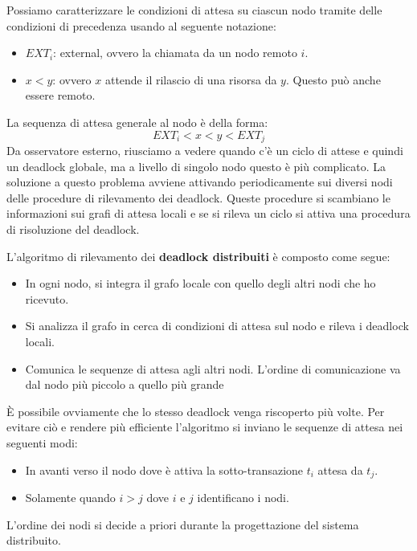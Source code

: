 Possiamo caratterizzare le condizioni di attesa su ciascun nodo tramite delle
condizioni di precedenza usando al seguente notazione:
\begin{itemize}
    \item \textbf{$EXT_i$}: external, ovvero la chiamata da un nodo remoto $i$.
    \item $x < y$: ovvero $x$ attende il rilascio di una risorsa da $y$. Questo
          può anche essere remoto.
\end{itemize}
La sequenza di attesa generale al nodo è della forma:
\begin{equation*}
    EXT_i < x < y < EXT_j
\end{equation*}
Da osservatore esterno, riusciamo a vedere quando c'è un ciclo di attese e
quindi un deadlock globale, ma a livello di singolo nodo questo è più complicato.
La soluzione a questo problema avviene attivando periodicamente sui diversi nodi
delle procedure di rilevamento dei deadlock. Queste procedure si scambiano le
informazioni sui grafi di attesa locali e se si rileva un ciclo si attiva una
procedura di risoluzione del deadlock.

L'algoritmo di rilevamento dei \textbf{deadlock distribuiti} è composto come segue:
\begin{itemize}
    \item In ogni nodo, si integra il grafo locale con quello degli altri nodi
          che ho ricevuto.
    \item Si analizza il grafo in cerca di condizioni di attesa sul nodo e
          rileva i deadlock locali.
    \item Comunica le sequenze di attesa agli altri nodi. L'ordine di
          comunicazione va dal nodo più piccolo a quello più grande
\end{itemize}

È possibile ovviamente che lo stesso deadlock venga riscoperto più volte. Per
evitare ciò e rendere più efficiente l'algoritmo si inviano le sequenze di attesa
nei seguenti modi:
\begin{itemize}
    \item In avanti verso il nodo dove è attiva la sotto-transazione $t_i$
          attesa da $t_j$.
    \item Solamente quando $i > j$ dove $i$ e $j$ identificano i nodi.
\end{itemize}

L'ordine dei nodi si decide a priori durante la progettazione del sistema distribuito.

